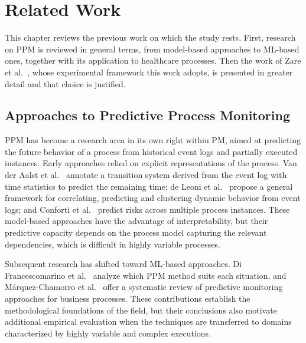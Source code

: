 \chapter{Related Work}
\label{cap:relatedwork}

This chapter reviews the previous work on which the study rests. First, research on PPM is reviewed in general terms, from model-based approaches to ML-based ones, together with its application to healthcare processes. Then the work of Zare et al.\ \cite{zare2025}, whose experimental framework this work adopts, is presented in greater detail and that choice is justified.

\section{Approaches to Predictive Process Monitoring}

PPM has become a research area in its own right within PM, aimed at predicting the future behavior of a process from historical event logs and partially executed instances. Early approaches relied on explicit representations of the process. Van der Aalst et al.\ \cite{aalst2011} annotate a transition system derived from the event log with time statistics to predict the remaining time; de Leoni et al.\ \cite{deleoni2016} propose a general framework for correlating, predicting and clustering dynamic behavior from event logs; and Conforti et al.\ \cite{conforti2015} predict risks across multiple process instances. These model-based approaches have the advantage of interpretability, but their predictive capacity depends on the process model capturing the relevant dependencies, which is difficult in highly variable processes.

Subsequent research has shifted toward ML-based approaches. Di Francescomarino et al.\ \cite{difrancescomarino2018} analyze which PPM method suits each situation, and M\'arquez-Chamorro et al.\ \cite{marquez2018} offer a systematic review of predictive monitoring approaches for business processes. These contributions establish the methodological foundations of the field, but their conclusions also motivate additional empirical evaluation when the techniques are transferred to domains characterized by highly variable and complex executions.

